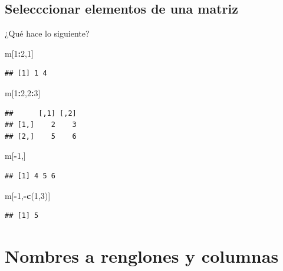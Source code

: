 \documentclass[
]{book}
\newenvironment{Shaded}{\begin{snugshade}}{\end{snugshade}}
\newcommand{\DecValTok}[1]{\textcolor[rgb]{0.00,0.00,0.81}{#1}}
\newcommand{\FunctionTok}[1]{\textcolor[rgb]{0.13,0.29,0.53}{\textbf{#1}}}
\newcommand{\NormalTok}[1]{#1}
\newcommand{\SpecialCharTok}[1]{\textcolor[rgb]{0.81,0.36,0.00}{\textbf{#1}}}
\begin{document}
\subsection{Selecccionar elementos de una matriz}\label{selecccionar-elementos-de-una-matriz}

¿Qué hace lo siguiente?

\begin{Shaded}
\begin{Highlighting}[]
\NormalTok{m[}\DecValTok{1}\SpecialCharTok{:}\DecValTok{2}\NormalTok{,}\DecValTok{1}\NormalTok{]}
\end{Highlighting}
\end{Shaded}

\begin{verbatim}
## [1] 1 4
\end{verbatim}

\begin{Shaded}
\begin{Highlighting}[]
\NormalTok{m[}\DecValTok{1}\SpecialCharTok{:}\DecValTok{2}\NormalTok{,}\DecValTok{2}\SpecialCharTok{:}\DecValTok{3}\NormalTok{]}
\end{Highlighting}
\end{Shaded}

\begin{verbatim}
##      [,1] [,2]
## [1,]    2    3
## [2,]    5    6
\end{verbatim}

\begin{Shaded}
\begin{Highlighting}[]
\NormalTok{m[}\SpecialCharTok{{-}}\DecValTok{1}\NormalTok{,]}
\end{Highlighting}
\end{Shaded}

\begin{verbatim}
## [1] 4 5 6
\end{verbatim}

\begin{Shaded}
\begin{Highlighting}[]
\NormalTok{m[}\SpecialCharTok{{-}}\DecValTok{1}\NormalTok{,}\SpecialCharTok{{-}}\FunctionTok{c}\NormalTok{(}\DecValTok{1}\NormalTok{,}\DecValTok{3}\NormalTok{)]}
\end{Highlighting}
\end{Shaded}

\begin{verbatim}
## [1] 5
\end{verbatim}

\section{Nombres a renglones y columnas}\label{nombres-a-renglones-y-columnas}
\end{document}
